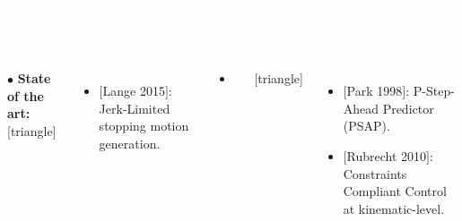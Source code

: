 \begin{frame}[noframenumbering]
\frametitle{{\textcolor{white}{\hspace{0.3cm}Constraints incompatibilities, state of the art and contribution}}}

\begin{columns}
\column{\textwidth+5mm}

$\bullet$ \textbf{State of the art:}
[triangle]                        
\begin{itemize}
\item $[$Lange 2015$]$: Jerk-Limited stopping motion generation.
\end{itemize}

\vspace{1mm}
\begin{itemize}

\addtolength{\itemindent}{-3mm}
\item[\hookrightarrow] 
\end{itemize}

[triangle]                        
\begin{itemize}
\item $[$Park 1998$]$: P-Step-Ahead Predictor (PSAP).
\item $[$Rubrecht 2010$]$: Constraints Compliant Control at kinematic-level.
\end{itemize}

\end{columns}
\end{frame}










